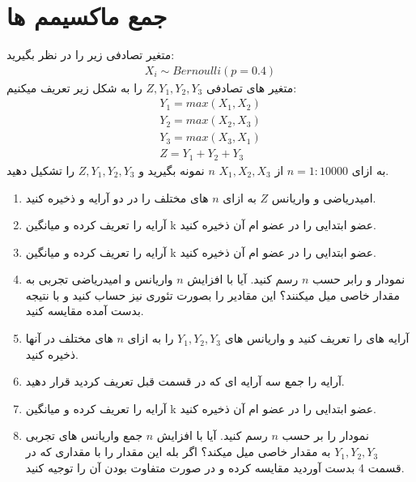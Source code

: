 \documentclass[a4paper]{article}
\begin{document}
\section{جمع ماکسیمم ها}
متغیر تصادفی زیر را در نظر بگیرید:
\begin{gather*}
	X_i \sim Bernoulli(p = 0.4)
\end{gather*}
متغیر های تصادفی $Z, Y_1, Y_2, Y_3$ را به شکل زیر تعریف میکنیم:
\begin{gather*}
	Y_1 = max(X_1, X_2)
	\\
	Y_2 = max(X_2, X_3)
	\\
	Y_3 = max(X_3, X_1)
	\\
	Z = Y_1 + Y_2 + Y_3
\end{gather*}
به ازای 
$ n = 1 : 10000 $
از $X_1, X_2, X_3$ $n$ نمونه بگیرید و $Z, Y_1, Y_2, Y_3$ را تشکیل دهید.
\begin{enumerate}
	\item
	امیدریاضی و واریانس $Z$ به ازای $n$ های مختلف را در دو آرایه  و  ذخیره کنید. 
	\item
	آرایه  را تعریف کرده و میانگین k عضو ابتدایی  را در عضو ام آن ذخیره کنید.
	\item
	آرایه  را تعریف کرده و میانگین k عضو ابتدایی  را در عضو ام آن ذخیره کنید.
	\item
	نمودار  و  رابر حسب $n$ رسم کنید. آیا با افزایش $n$ واریانس و امیدریاضی تجربی به مقدار خاصی میل میکنند؟ این مقادیر را بصورت تئوری نیز حساب کنید و با نتیجه بدست آمده مقایسه کنید.
	\item
	آرایه های  را تعریف کنید و واریانس های $Y_1, Y_2, Y_3$ را به ازای $n$ های مختلف در آنها ذخیره کنید.
	\item
	آرایه  را جمع سه آرایه ای که در قسمت قبل تعریف کردید قرار دهید.
	\item
	آرایه  را تعریف کرده و میانگین k عضو ابتدایی  را در عضو ام آن ذخیره کنید.
	\item
	نمودار  را بر حسب $n$ رسم کنید. آیا با افزایش $n$ جمع واریانس های تجربی $Y_1, Y_2, Y_3$ به مقدار خاصی میل میکند؟ اگر بله این مقدار را با مقداری که در قسمت 4 بدست آوردید مقایسه کرده و در صورت متفاوت بودن آن را توجیه کنید.
\end{enumerate}
\end{document}
